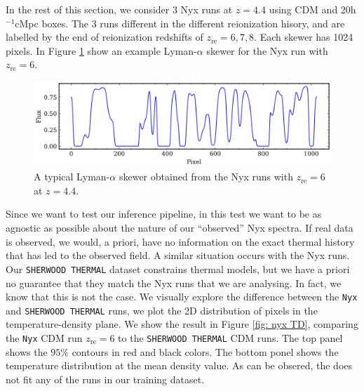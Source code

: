 In the rest of this section, we consider 3 Nyx runs at $z=4.4$ using CDM and 20h$^{-1}$cMpc boxes. The 3 runs different in the different reionization hisory, and are labelled by the end of reionization redshifts of $z_\mathrm{re}=6,7,8$. Each skewer has 1024 pixels. In Figure \ref{fig: nyx skewer} show an example Lyman-$\alpha$ skewer for the Nyx run with $z_\mathrm{re}=6$.


\begin{figure}
    \centering
    \includegraphics[width=0.8\linewidth]{img/ML/nyx_skewer.png}
    \caption{A typical Lyman-$\alpha$ skewer obtained from the Nyx runs with $z_\mathrm{re}=6$ at $z=4.4$.}
    \label{fig: nyx skewer}
\end{figure}
Since we want to test our inference pipeline, in this test we want to be as agnostic as possible about the nature of our ``observed'' Nyx spectra. If real data is observed, we would, a priori, have no information on the exact thermal history that has led to the observed field. A similar situation occurs with the Nyx runs. Our \texttt{SHERWOOD THERMAL} dataset constrains thermal models, but we have a priori no guarantee that they match the Nyx runs that we are analysing. In fact, we know that this is not the case. We visually explore the difference between the \texttt{Nyx} and \texttt{SHERWOOD THERMAL} runs, we plot the 2D distribution of pixels in the temperature-density plane. We show the result in Figure \ref{fig: nyx TD}, comparing the \texttt{Nyx} CDM run $z_\mathrm{re}=6$ to the \texttt{SHERWOOD THERMAL} CDM runs. The top panel shows the $95\%$ contours in red and black colors. The bottom ponel shows the temperature distribution at the mean density value. As can be obsered, the  does not fit any of the runs in our training dataset.


